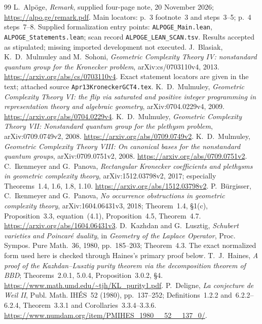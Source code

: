\documentclass[11pt,a4paper]{article}
\theoremstyle{named}\newtheorem{finding}{Finding}[section]
\theoremstyle{definition}\newtheorem{definition}[finding]{Definition}
\theoremstyle{remark}\newtheorem{remark}[finding]{Remark}
\begin{document}
\begin{thebibliography}{99}
 L.~Alp\"oge, \emph{Remark}, supplied four-page note, 20 November 2026; \url{https://alpo.ge/remark.pdf}. Main locators: p.~3 footnote~3 and steps~3--5; p.~4 steps~7--8. Supplied formalization entry points: \texttt{ALPOGE\_Main.lean}, \texttt{ALPOGE\_Statements.lean}; scan record \texttt{ALPOGE\_LEAN\_SCAN.tsv}. Results accepted as stipulated; missing imported development not executed.
 J.~Blasiak, K.~D.~Mulmuley and M.~Sohoni, \emph{Geometric Complexity Theory IV: nonstandard quantum group for the Kronecker problem}, arXiv:cs/0703110v4, 2013. \url{https://arxiv.org/abs/cs/0703110v4}. Exact statement locators are given in the text; attached source \texttt{Apr13KroneckerGCT4.tex}.
 K.~D.~Mulmuley, \emph{Geometric Complexity Theory VI: the flip via saturated and positive integer programming in representation theory and algebraic geometry}, arXiv:0704.0229v4, 2009. \url{https://arxiv.org/abs/0704.0229v4}.
 K.~D.~Mulmuley, \emph{Geometric Complexity Theory VII: Nonstandard quantum group for the plethysm problem}, arXiv:0709.0749v2, 2008. \url{https://arxiv.org/abs/0709.0749v2}.
 K.~D.~Mulmuley, \emph{Geometric Complexity Theory VIII: On canonical bases for the nonstandard quantum groups}, arXiv:0709.0751v2, 2008. \url{https://arxiv.org/abs/0709.0751v2}.
 C.~Ikenmeyer and G.~Panova, \emph{Rectangular Kronecker coefficients and plethysms in geometric complexity theory}, arXiv:1512.03798v2, 2017; especially Theorems~1.4, 1.6, 1.8, 1.10. \url{https://arxiv.org/abs/1512.03798v2}.
 P.~B\"urgisser, C.~Ikenmeyer and G.~Panova, \emph{No occurrence obstructions in geometric complexity theory}, arXiv:1604.06431v3, 2018; Theorem~1.4, \S1(c), Proposition~3.3, equation~(4.1), Proposition~4.5, Theorem~4.7. \url{https://arxiv.org/abs/1604.06431v3}.
 D.~Kazhdan and G.~Lusztig, \emph{Schubert varieties and Poincar\'e duality}, in \emph{Geometry of the Laplace Operator}, Proc. Sympos. Pure Math.~36, 1980, pp.~185--203; Theorem~4.3. The exact normalized form used here is checked through Haines's primary proof below.
 T.~J.~Haines, \emph{A proof of the Kazhdan--Lusztig purity theorem via the decomposition theorem of BBD}; Theorems~2.0.1, 5.0.4, Proposition~3.0.2, \S4. \url{https://www.math.umd.edu/~tjh/KL_purity1.pdf}.
 P.~Deligne, \emph{La conjecture de Weil II}, Publ. Math. IH\'ES~52 (1980), pp.~137--252; Definitions~1.2.2 and~6.2.2--6.2.4, Theorem~3.3.1 and Corollaries~3.3.4--3.3.6. \url{https://www.numdam.org/item/PMIHES_1980__52__137_0/}.

\end{thebibliography}
\end{document}
